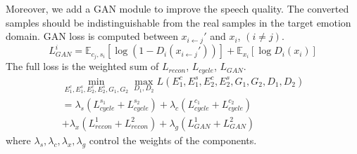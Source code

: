 \documentclass{article}
\begin{document}
Moreover, we add a GAN module to improve the speech quality. The converted samples should be indistinguishable from the real samples in the target emotion domain. GAN loss is computed between $x_{i\leftarrow j}'$ and $x_i$, $(i \neq j)$.
\begin{equation}
L_{GAN}^i = \mathbb{E}_{c_j, s_i}[\log(1-D_i(x_{i\leftarrow j}'))] + \mathbb{E}_{x_i}[\log D_i(x_i)]
\end{equation}
The full loss is the weighted sum of $L_{recon}$, $L_{cycle}$, $L_{GAN}$.
\begin{equation}
\begin{aligned}
\min_{E_1^c,E_1^s,E_2^c,E_2^s, G_1,G_2}\max_{D_1,D_2} L(E_1^c, E_1^s, E_2^c, E_2^s, G_1, G_2, D_1, D_2) \\
= \lambda_s (L_{cycle}^{s_1} + L_{cycle}^{s_2}) + \lambda_c (L_{cycle}^{c_1} + L_{cycle}^{c_2}) \ \qquad \qquad \\
+ \lambda_x (L_{recon}^1 + L_{recon}^2) + \lambda_g (L_{GAN}^1 + L_{GAN}^2) \qquad \quad
\end{aligned}
\end{equation}
where $\lambda_s, \lambda_c, \lambda_x, \lambda_g$ control the weights of the components.
%
%









\end{document}
